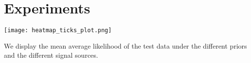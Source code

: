 \section{Experiments}

\begin{marginfigure}
    \texttt{[image: heatmap\_ticks\_plot.png]}%
    \caption{We display the mean average likelihood of the test data under the different priors and the different signal sources.}%
    \label{fig:heatmap_toy}
\end{marginfigure}
